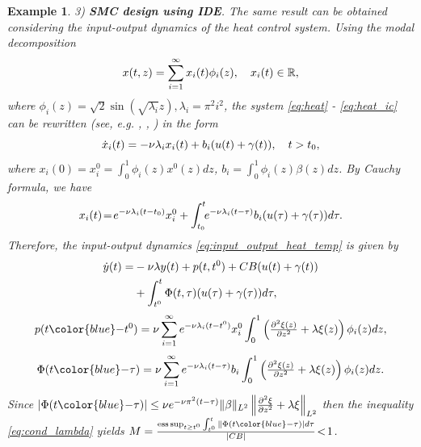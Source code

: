 \documentclass{article}
\newcommand{\R}{\mathbb{R}}
\newtheorem{example}{Example}
\DeclareMathOperator*{\esssup}{ess\,sup}
\begin{document}
{\begin{example}
3) \textbf{SMC design using IDE}.		The same result can be obtained  considering the input-output dynamics of the heat control system. Using the modal decomposition  \vspace{-1mm}
	\begin{equation}
	 		x(t,z)=\sum_{i=1}^{\infty} x_i(t)\phi_i(z), \quad x_i(t)\in \R,\vspace{-1mm}
	 	\end{equation}
 	where $\phi_i(z)=\sqrt{2}\sin(\sqrt{\lambda_i} z), \lambda_i=\pi^2 i^2$,  
 	the system  \eqref{eq:heat} - \eqref{eq:heat_ic} can be rewritten (see, e.g. \cite{Balas1988:JMAA}, \cite{PrieurTrelat2019:TAC},  \cite{KatzFridman2021:EJC}) in the form \vspace{-1mm}
	\begin{equation}\label{eq:heat_model}
	 		\dot x_i(t)=-\nu \lambda_ix_i(t)+b_{i}(u(t)+\gamma(t)), \quad t>t_0,\vspace{-1mm}
	 	\end{equation}
 	where $x_i(0)=x^0_i=\int^1_0\!\phi_i(z) x^0(z)dz$, $b_{i}=\int^1_0\!\phi_i(z) \beta(z) dz$.
 	 By Cauchy formula, we have\vspace{-1mm}
 	\[
 	x_i(t)\!=\!e^{-\nu \lambda_i(t-t_0)}x^0_i+\int^t_{t_0} \!\!e^{-\nu \lambda_i(t-\tau)}b_{i}(u(
 	\tau)+\gamma(\tau)) d\tau.\vspace{-1mm}
     \]
Therefore, the input-output dynamics \eqref{eq:input_output_heat_temp} is given by\vspace{-1mm}
 \begin{equation}\label{eq:input_output_heat}
 \begin{split}
	 \dot y(t)=&-\nu\lambda y(t)+p(t,t^0)+CB(u(t)+\gamma(t))\\
	 &+\int^{t}_{t^0}\Phi(t,\tau)(u(\tau)+\gamma(\tau)) d\tau,
	 \end{split}\vspace{-2mm}
 \end{equation}
 \[
 p(t{\color{blue}-}t^0)=\nu\sum_{i=1}^{\infty}e^{-\nu\lambda_i(t-t^0)}x_i^0\int^1_0  \left(\tfrac{\partial^2 \xi(z)}{\partial z^2}+\lambda \xi(z)\right) \phi_i(z)dz,\vspace{-2mm}
 \]
 \[
 \Phi(t{\color{blue}-}\tau)=\nu \sum_{i=1}^{\infty}e^{-\nu\lambda_i(t-\tau)}b_i \int^1_0  \left(\tfrac{\partial^2 \xi(z)}{\partial z^2}+\lambda \xi(z)\right) \phi_i(z)dz.\vspace{-1mm}
 \]
 Since $|\Phi(t{\color{blue}-}\tau)|\leq \nu e^{-\nu \pi^2(t-\tau)} \|\beta\|_{L^2}\left\|\frac{\partial^2 \xi}{\partial z^2}+\lambda \xi\right\|_{L^2} $ then 
 the inequality \eqref{eq:cond_lambda} yields $M=\frac{\esssup_{t\geq t^0}\int^t_{t^0}\|\Phi(t{\color{blue}-}\tau)| d\tau}{|CB|}\!<\!1$. 
 

\end{example}}
\end{document}
